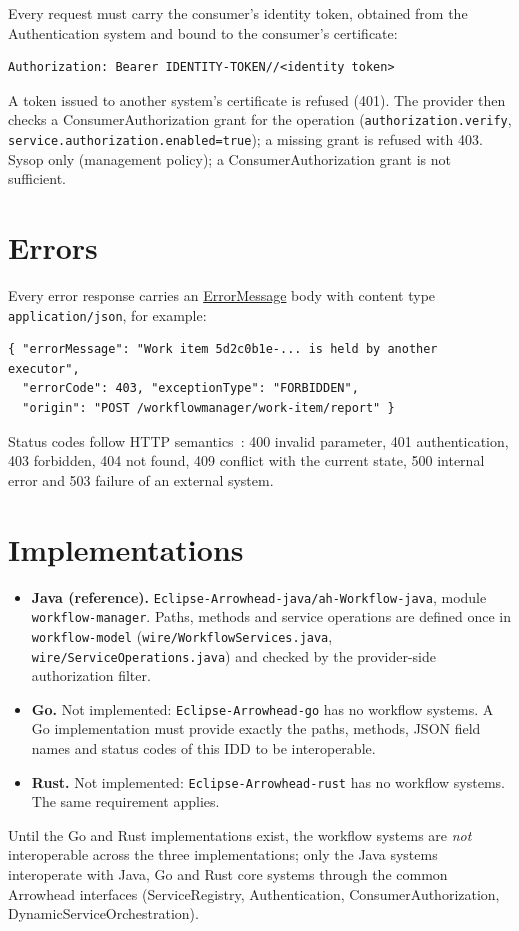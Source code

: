 \documentclass[a4paper]{arrowhead}
\newcommand{\mref}[1]{{\textcolor{ArrowheadPurple}{\hyperref[sec:model:#1]{#1}}}}
\begin{document}
Every request must carry the consumer's identity token, obtained from the Authentication system and bound to the
consumer's certificate:
\begin{lstlisting}
Authorization: Bearer IDENTITY-TOKEN//<identity token>
\end{lstlisting}
A token issued to another system's certificate is refused (401). The provider then checks a ConsumerAuthorization
grant for the operation (\texttt{authorization.verify}, \texttt{service.authorization.enabled=true}); a missing grant is
refused with 403. Sysop only (management policy); a ConsumerAuthorization grant is not sufficient.


\section{Errors}
\label{sec:errors}
Every error response carries an \mref{ErrorMessage} body with content type \texttt{application/json}, for example:
\begin{lstlisting}
{ "errorMessage": "Work item 5d2c0b1e-... is held by another executor",
  "errorCode": 403, "exceptionType": "FORBIDDEN",
  "origin": "POST /workflowmanager/work-item/report" }
\end{lstlisting}
Status codes follow HTTP semantics~\cite{rfc9110}: 400 invalid parameter, 401 authentication, 403 forbidden, 404 not
found, 409 conflict with the current state, 500 internal error and 503 failure of an external system.


\section{Implementations}
\label{sec:implementations}
\begin{itemize}
\item \textbf{Java (reference).} \texttt{Eclipse-Arrowhead-java/ah-Workflow-java}, module \texttt{workflow-manager}. Paths, methods and service
operations are defined once in \texttt{workflow-model} (\texttt{wire/WorkflowServices.java}, \texttt{wire/ServiceOperations.java}) and checked by the provider-side authorization filter.
\item \textbf{Go.} Not implemented: \texttt{Eclipse-Arrowhead-go} has no workflow systems. A Go implementation must
provide exactly the paths, methods, JSON field names and status codes of this IDD to be interoperable.
\item \textbf{Rust.} Not implemented: \texttt{Eclipse-Arrowhead-rust} has no workflow systems. The same requirement applies.
\end{itemize}
Until the Go and Rust implementations exist, the workflow systems are \emph{not} interoperable across the three
implementations; only the Java systems interoperate with Java, Go and Rust core systems through the common Arrowhead
interfaces (ServiceRegistry, Authentication, ConsumerAuthorization, DynamicServiceOrchestration).
\end{document}
